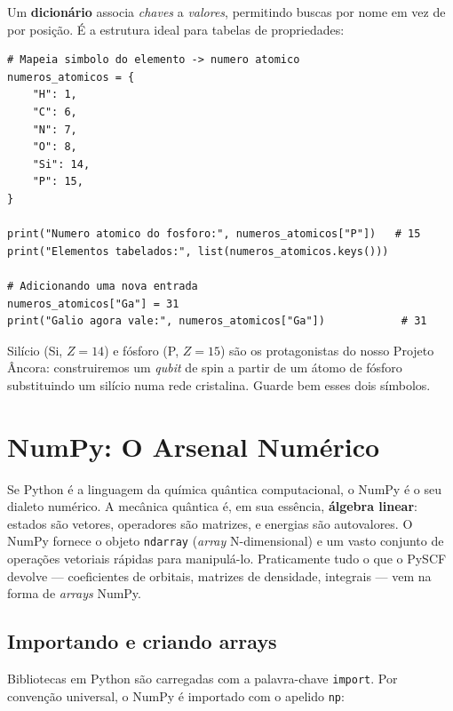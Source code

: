 \documentclass[11pt,a4paper,openany]{book}
\newcommand{\code}[1]{\texttt{#1}}
\newcommand{\pyscf}{\textsf{PySCF}}
\newcommand{\numpy}{\textsf{NumPy}}
\newcommand{\python}{\textsf{Python}}
\newcommand{\qubit}{\emph{qubit}}
\begin{document}
Um \textbf{dicionário} associa \emph{chaves} a \emph{valores}, permitindo buscas por
nome em vez de por posição. É a estrutura ideal para tabelas de propriedades:

\begin{lstlisting}[style=python,caption={Tabela de números atômicos com dicionário.},label={lst:dict}]
# Mapeia simbolo do elemento -> numero atomico
numeros_atomicos = {
    "H": 1,
    "C": 6,
    "N": 7,
    "O": 8,
    "Si": 14,
    "P": 15,
}

print("Numero atomico do fosforo:", numeros_atomicos["P"])   # 15
print("Elementos tabelados:", list(numeros_atomicos.keys()))

# Adicionando uma nova entrada
numeros_atomicos["Ga"] = 31
print("Galio agora vale:", numeros_atomicos["Ga"])            # 31
\end{lstlisting}

\begin{caixanota}
Silício (Si, $Z=14$) e fósforo (P, $Z=15$) são os protagonistas do nosso
Projeto Âncora: construiremos um \qubit{} de spin a partir de um átomo de fósforo
substituindo um silício numa rede cristalina. Guarde bem esses dois símbolos.
\end{caixanota}

\section{NumPy: O Arsenal Numérico}
\label{sec:numpy}

Se \python{} é a linguagem da química quântica computacional, o \numpy{} é o seu
dialeto numérico. A mecânica quântica é, em sua essência, \textbf{álgebra linear}:
estados são vetores, operadores são matrizes, e energias são autovalores. O
\numpy{} fornece o objeto \code{ndarray} (\emph{array} N-dimensional) e um vasto
conjunto de operações vetoriais rápidas para manipulá-lo. Praticamente tudo o que
o \pyscf{} devolve --- coeficientes de orbitais, matrizes de densidade, integrais
--- vem na forma de \emph{arrays} \numpy{}.

\subsection{Importando e criando arrays}

Bibliotecas em \python{} são carregadas com a palavra-chave \code{import}. Por
convenção universal, o \numpy{} é importado com o apelido \code{np}:
\end{document}

